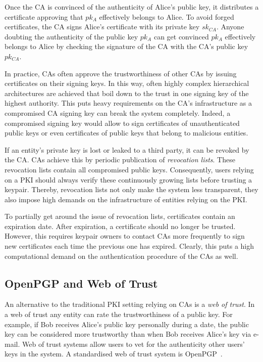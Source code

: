 Once the CA is convinced of the authenticity of Alice's public key, it distributes a certificate approving that $pk_A$ effectively belongs to Alice. To avoid forged certificates, the CA signs Alice's certificate with its private key $sk_{CA}$. Anyone doubting the authenticity of the public key $pk_A$ can get convinced $pk_A$ effectively belongs to Alice by checking the signature of the CA with the CA's public key $pk_{CA}$.

In practice, CAs often approve the trustworthiness of other CAs by issuing certificates on their signing keys. In this way, often highly complex hierarchical architectures are achieved that boil down to the trust in one signing key of the highest authority. This puts heavy requirements on the CA's infrastructure as a compromised CA signing key can break the system completely. Indeed, a compromised signing key would allow to sign certificates of unauthenticated public keys or even certificates of public keys that belong to malicious entities.

If an entity's private key is lost or leaked to a third party, it can be revoked by the CA. CAs achieve this by periodic publication of \textit{revocation lists}. These revocation lists contain all compromised public keys. Consequently, users relying on a PKI should always verify these continuously growing lists before trusting a keypair. Thereby, revocation lists not only make the system less transparent, they also impose high demands on the infrastructure of entities relying on the PKI.

To partially get around the issue of revocation lists, certificates contain an expiration date. After expiration, a certificate should no longer be trusted. However, this requires keypair owners to contact CAs more frequently to sign new certificates each time the previous one has expired. Clearly, this puts a high computational demand on the authentication procedure of the CAs as well.

\subsection{OpenPGP and Web of Trust}
\label{sec:web_of_trust}
An alternative to the traditional PKI setting relying on CAs is a \textit{web of trust}. In a web of trust any entity can rate the trustworthiness of a public key. For example, if Bob receives Alice's public key personally during a date, the public key can be considered more trustworthy than when Bob receives Alice's key via e-mail. Web of trust systems allow users to vet for the authenticity other users' keys in the system. A standardised web of trust system is OpenPGP~\cite{rfc4880}.

